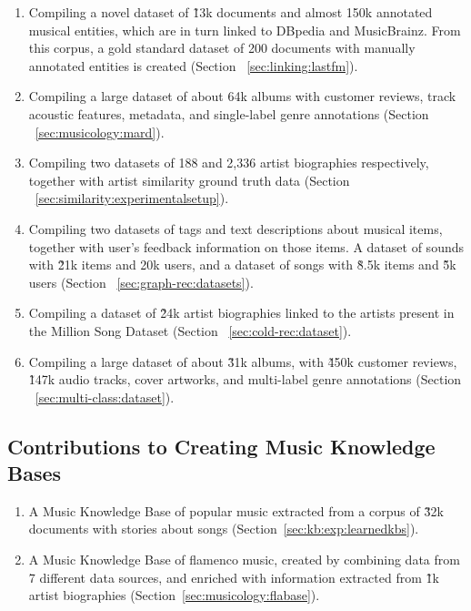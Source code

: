 \begin{enumerate}

\item 
Compiling a novel dataset of \~13k documents and almost 150k annotated musical entities, which are in turn linked to DBpedia and MusicBrainz. From this corpus, a gold standard dataset of 200 documents with manually annotated entities is created (Section ~\ref{sec:linking:lastfm}).

\item
Compiling a large dataset of about 64k albums with customer reviews, track acoustic features, metadata, and single-label genre annotations (Section ~\ref{sec:musicology:mard}).

\item
Compiling two datasets of 188 and 2,336 artist biographies respectively, together with artist similarity ground truth data (Section ~\ref{sec:similarity:experimentalsetup}).

\item
Compiling two datasets of tags and text descriptions about musical items, together with user's feedback information on those items. A dataset of sounds with \~21k items and 20k users, and a dataset of songs with \~8.5k items and \~5k users (Section ~\ref{sec:graph-rec:datasets}).

\item
Compiling a dataset of \~24k artist biographies linked to the artists present in the Million Song Dataset (Section ~\ref{sec:cold-rec:dataset}).

\item
Compiling a large dataset of about \~31k albums, with \~450k customer reviews, \~147k audio tracks, cover artworks, and multi-label genre annotations (Section ~\ref{sec:multi-class:dataset}).

\end{enumerate}

\subsection{Contributions to Creating Music Knowledge Bases}

\begin{enumerate}
\item
A Music Knowledge Base of popular music extracted from a corpus of \~32k documents with stories about songs (Section~\ref{sec:kb:exp:learnedkbs}).

\item
A Music Knowledge Base of flamenco music, created by combining data from 7 different data sources, and enriched with information extracted from \~1k artist biographies (Section~\ref{sec:musicology:flabase}).

\end{enumerate}

